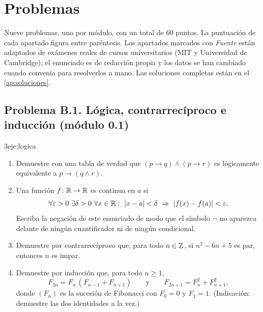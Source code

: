 \chapter{Problemas}
\label{cap:problemas}

Nueve problemas, uno por módulo, con un total de 60 puntos. La puntuación de cada apartado figura entre paréntesis. Los apartados marcados con \emph{Fuente} están adaptados de exámenes reales de cursos universitarios (MIT y Universidad de Cambridge); el enunciado es de redacción propia y los datos se han cambiado cuando convenía para resolverlos a mano. Las soluciones completas están en el \cref{ap:soluciones}.

\section*{Problema B.1. Lógica, contrarrecíproco e inducción (módulo 0.1)}

\begin{ejercicio}{3}{eje:logica}
\begin{enumerate}[label=(\alph*)]
  \item {} Demuestre con una tabla de verdad que $(p\to q)\wedge(p\to r)$ es lógicamente equivalente a $p\to(q\wedge r)$.
  \item {} Una función $f\colon\mathbb{R}\to\mathbb{R}$ es continua en $a$ si
  \[
  \forall\varepsilon>0\ \exists\delta>0\ \forall x\in\R:\ \abs{x-a}<\delta\ \Rightarrow\ \abs{f(x)-f(a)}<\varepsilon .
  \]
  Escriba la negación de este enunciado de modo que el símbolo $\neg$ no aparezca delante de ningún cuantificador ni de ningún condicional.
  \item {} Demuestre por contrarrecíproco que, para todo $n\in\mathbb{Z}$, si $n^{2}-6n+5$ es par, entonces $n$ es impar.
  \item {} Demuestre por inducción que, para todo $n\ge1$,
  \[
  F_{2n}=F_n\,(F_{n-1}+F_{n+1})\qquad\text{y}\qquad F_{2n+1}=F_n^{2}+F_{n+1}^{2},
  \]
  donde $(F_n)$ es la sucesión de Fibonacci con $F_0=0$ y $F_1=1$. (Indicación: demuestre las dos identidades a la vez.)
\end{enumerate}
\end{ejercicio}


